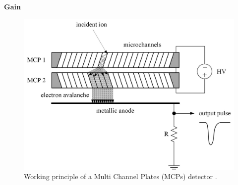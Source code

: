 	\textbf{Gain}\\
	\begin{figure}[h] %
		\centering
		\includegraphics[width=.7\textwidth]{Bilder/MCP_PrinipleSchema.jpg}
		\caption{Working principle of a Multi Channel Plates (MCPs) detector \cite{Wiza_1979_MCP,Diss_Meyer}.}
		\label{fig:MCPPrincipleSchema}
	\end{figure}
	
